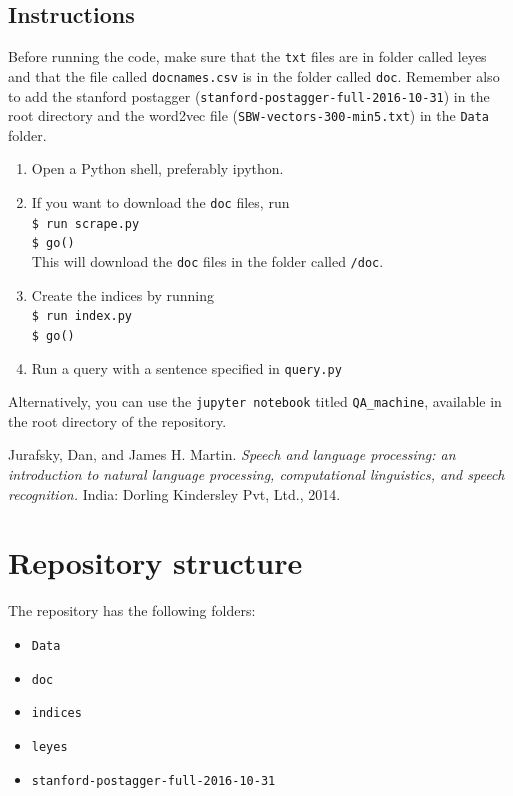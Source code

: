 \documentclass[letterpaper, margin=1in]{article}
\begin{document}
\subsection{Instructions}
Before running the code, make sure that the \texttt{txt} files are in folder called leyes and that the file called \texttt{docnames.csv} is in the folder called \texttt{doc}. Remember also to add the stanford postagger (\texttt{stanford-postagger-full-2016-10-31}) in the root directory and the word2vec file (\texttt{SBW-vectors-300-min5.txt}) in the \texttt{Data} folder.

\begin{enumerate}
\item Open a Python shell, preferably ipython.
\item If you want to download the \texttt{doc} files, run \\ \texttt{\$ run scrape.py} \\ \texttt{\$ go()} \\ This will download the \texttt{doc} files in the folder called \texttt{/doc}.
\item Create the indices by running \\ \texttt{\$ run index.py} \\ \texttt{\$ go()}
\item Run a query with a sentence specified in \texttt{query.py}
\end{enumerate}

Alternatively, you can use the \texttt{jupyter notebook} titled \texttt{QA{\_}machine}, available in the root directory of the repository.

\begin{thebibliography}{9}
  Jurafsky, Dan, and James H. Martin. 
  \emph{Speech and language processing: an introduction to natural language processing, computational linguistics, and speech recognition.} 
  India: Dorling Kindersley Pvt, Ltd., 2014.

\end{thebibliography}

\newpage
\appendix

\section{Repository structure}
The repository has the following folders:
\begin{itemize}
\item \texttt{Data}
\item \texttt{doc}
\item \texttt{indices}
\item \texttt{leyes}
\item \texttt{stanford-postagger-full-2016-10-31}
\end{itemize}
\end{document}

